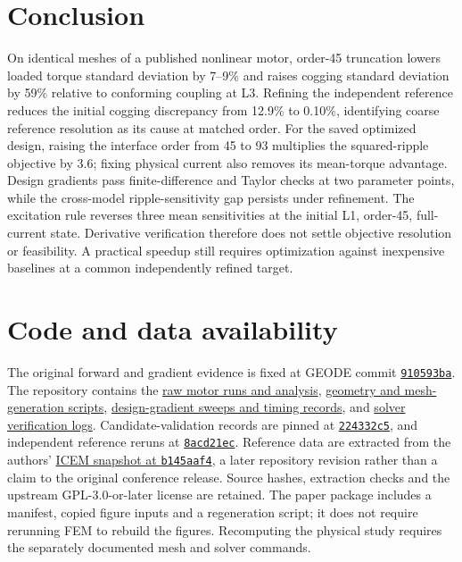 \documentclass{anvil-paper}
\begin{document}
\section{Conclusion}
On identical meshes of a published nonlinear motor, order-45 truncation
lowers loaded torque standard deviation by 7--9\% and raises cogging
standard deviation by 59\% relative to conforming coupling at L3.
Refining the independent reference reduces the initial cogging discrepancy
from 12.9\% to 0.10\%, identifying coarse reference resolution as its cause
at matched order. For the saved optimized design, raising the interface
order from 45 to 93 multiplies the squared-ripple objective by 3.6;
fixing physical current also removes its mean-torque advantage.
Design gradients pass finite-difference and Taylor checks at two parameter
points, while the cross-model ripple-sensitivity gap persists under
refinement. The excitation rule reverses three mean sensitivities at the
initial L1, order-45, full-current state. Derivative verification therefore
does not settle objective resolution or feasibility. A practical speedup
still requires optimization against inexpensive baselines at a common
independently refined target.

\section*{Code and data availability}
The original forward and gradient evidence is fixed at GEODE commit
\href{https://github.com/rjwalters/geode-fem/tree/910593bad6f64f9f01671c2632b57034e72b9c61}{\texttt{910593ba}}.
The repository contains the
\href{https://github.com/rjwalters/geode-fem/tree/910593bad6f64f9f01671c2632b57034e72b9c61/benchmarks/motor_reference/forward_harmonic}{raw motor runs and analysis},
\href{https://github.com/rjwalters/geode-fem/tree/910593bad6f64f9f01671c2632b57034e72b9c61/benchmarks/motor_reference/geometry}{geometry and mesh-generation scripts},
\href{https://github.com/rjwalters/geode-fem/tree/910593bad6f64f9f01671c2632b57034e72b9c61/benchmarks/motor_shape_gradient/design}{design-gradient sweeps and timing records},
and \href{https://github.com/rjwalters/geode-fem/tree/910593bad6f64f9f01671c2632b57034e72b9c61/benchmarks/motor_nonlinear_m1}{solver verification logs}.
Candidate-validation records are pinned at
\href{https://github.com/rjwalters/geode-fem/tree/224332c526be1191183af82b610973c7778de720/benchmarks/motor_validation}{\texttt{224332c5}},
and independent reference reruns at
\href{https://github.com/rjwalters/geode-fem/tree/8acd21ecf85d89fe077275a3c04ca70b53963d43/benchmarks/motor_reference/reference_refinement}{\texttt{8acd21ec}}.
Reference data are extracted from the authors'
\href{https://github.com/MichaelWiesheu/ICEMsnapshot/tree/b145aaf4ab1a6424828bc941eaf172f48fa0d458}{ICEM snapshot at \texttt{b145aaf4}},
a later repository revision rather than a claim to the original conference
release. Source hashes, extraction checks and the upstream GPL-3.0-or-later license
are retained. The paper package includes a manifest, copied figure inputs
and a regeneration script; it does not require rerunning FEM to rebuild
the figures. Recomputing the physical study requires the separately
documented mesh and solver commands.
\end{document}
